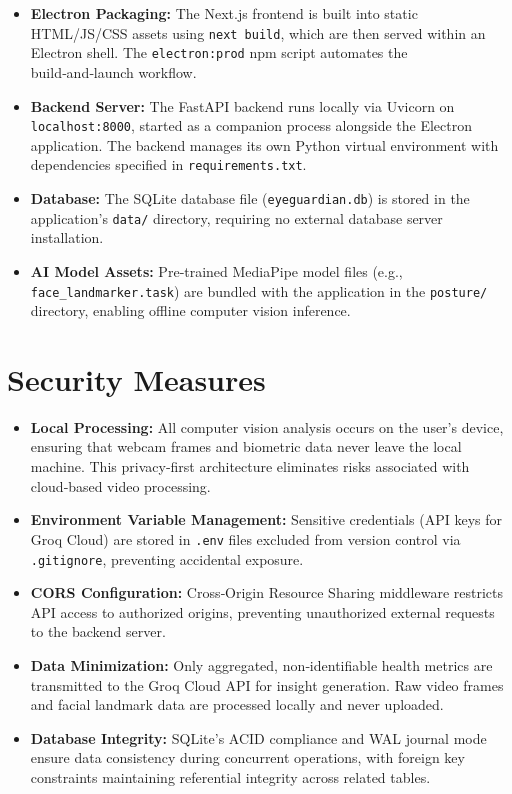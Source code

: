 \documentclass[12pt]{report}
\begin{document}
\begin{itemize}
    \item \textbf{Electron Packaging:} The Next.js frontend is built into static HTML/JS/CSS assets using \texttt{next build}, which are then served within an Electron shell. The \texttt{electron:prod} npm script automates the build‑and‑launch workflow.
    \item \textbf{Backend Server:} The FastAPI backend runs locally via Uvicorn on \texttt{localhost:8000}, started as a companion process alongside the Electron application. The backend manages its own Python virtual environment with dependencies specified in \texttt{requirements.txt}.
    \item \textbf{Database:} The SQLite database file (\texttt{eyeguardian.db}) is stored in the application's \texttt{data/} directory, requiring no external database server installation.
    \item \textbf{AI Model Assets:} Pre‑trained MediaPipe model files (e.g., \texttt{face\_landmarker.task}) are bundled with the application in the \texttt{posture/} directory, enabling offline computer vision inference.
\end{itemize}

\section{Security Measures}

\begin{itemize}
    \item \textbf{Local Processing:} All computer vision analysis occurs on the user's device, ensuring that webcam frames and biometric data never leave the local machine. This privacy‑first architecture eliminates risks associated with cloud‑based video processing.
    \item \textbf{Environment Variable Management:} Sensitive credentials (API keys for Groq Cloud) are stored in \texttt{.env} files excluded from version control via \texttt{.gitignore}, preventing accidental exposure.
    \item \textbf{CORS Configuration:} Cross‑Origin Resource Sharing middleware restricts API access to authorized origins, preventing unauthorized external requests to the backend server.
    \item \textbf{Data Minimization:} Only aggregated, non‑identifiable health metrics are transmitted to the Groq Cloud API for insight generation. Raw video frames and facial landmark data are processed locally and never uploaded.
    \item \textbf{Database Integrity:} SQLite's ACID compliance and WAL journal mode ensure data consistency during concurrent operations, with foreign key constraints maintaining referential integrity across related tables.
\end{itemize}
\end{document}

